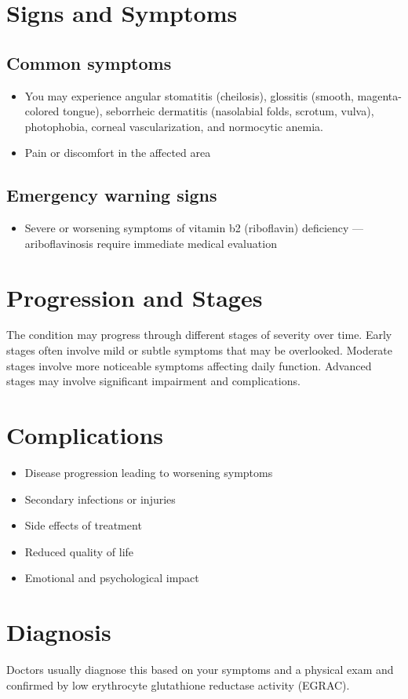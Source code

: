 \section{Signs and Symptoms}
\subsection{Common symptoms}
\begin{itemize}[noitemsep]
  \item You may experience angular stomatitis (cheilosis), glossitis (smooth, magenta-colored tongue), seborrheic dermatitis (nasolabial folds, scrotum, vulva), photophobia, corneal vascularization, and normocytic anemia.
  \item Pain or discomfort in the affected area
  \end{itemize}
\subsection{Emergency warning signs}
\begin{itemize}[noitemsep]
  \item Severe or worsening symptoms of vitamin b2 (riboflavin) deficiency --- ariboflavinosis require immediate medical evaluation
\end{itemize}
\section{Progression and Stages}
The condition may progress through different stages of severity over time. Early stages often involve mild or subtle symptoms that may be overlooked. Moderate stages involve more noticeable symptoms affecting daily function. Advanced stages may involve significant impairment and complications.
\section{Complications}
\begin{itemize}[noitemsep]
  \item Disease progression leading to worsening symptoms
  \item Secondary infections or injuries
  \item Side effects of treatment
  \item Reduced quality of life
  \item Emotional and psychological impact
\end{itemize}
\section{Diagnosis}
Doctors usually diagnose this based on your symptoms and a physical exam and confirmed by low erythrocyte glutathione reductase activity (EGRAC).


